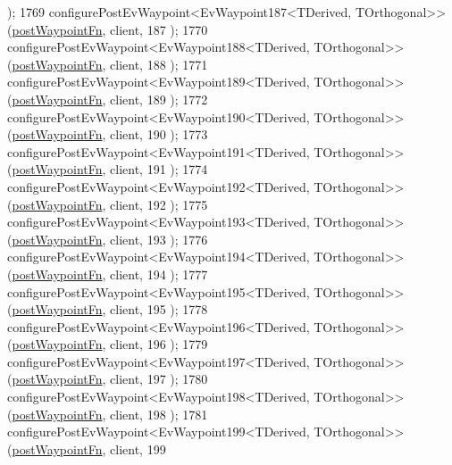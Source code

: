 \begin{DoxyCode}
      );
1769     configurePostEvWaypoint<EvWaypoint187<TDerived, TOrthogonal>>(\hyperlink{classcl__move__base__z_1_1WaypointEventDispatcher_a964a57fcce5d48ec60243230722d8dd7}{postWaypointFn}, client, 187
      );
1770     configurePostEvWaypoint<EvWaypoint188<TDerived, TOrthogonal>>(\hyperlink{classcl__move__base__z_1_1WaypointEventDispatcher_a964a57fcce5d48ec60243230722d8dd7}{postWaypointFn}, client, 188
      );
1771     configurePostEvWaypoint<EvWaypoint189<TDerived, TOrthogonal>>(\hyperlink{classcl__move__base__z_1_1WaypointEventDispatcher_a964a57fcce5d48ec60243230722d8dd7}{postWaypointFn}, client, 189
      );
1772     configurePostEvWaypoint<EvWaypoint190<TDerived, TOrthogonal>>(\hyperlink{classcl__move__base__z_1_1WaypointEventDispatcher_a964a57fcce5d48ec60243230722d8dd7}{postWaypointFn}, client, 190
      );
1773     configurePostEvWaypoint<EvWaypoint191<TDerived, TOrthogonal>>(\hyperlink{classcl__move__base__z_1_1WaypointEventDispatcher_a964a57fcce5d48ec60243230722d8dd7}{postWaypointFn}, client, 191
      );
1774     configurePostEvWaypoint<EvWaypoint192<TDerived, TOrthogonal>>(\hyperlink{classcl__move__base__z_1_1WaypointEventDispatcher_a964a57fcce5d48ec60243230722d8dd7}{postWaypointFn}, client, 192
      );
1775     configurePostEvWaypoint<EvWaypoint193<TDerived, TOrthogonal>>(\hyperlink{classcl__move__base__z_1_1WaypointEventDispatcher_a964a57fcce5d48ec60243230722d8dd7}{postWaypointFn}, client, 193
      );
1776     configurePostEvWaypoint<EvWaypoint194<TDerived, TOrthogonal>>(\hyperlink{classcl__move__base__z_1_1WaypointEventDispatcher_a964a57fcce5d48ec60243230722d8dd7}{postWaypointFn}, client, 194
      );
1777     configurePostEvWaypoint<EvWaypoint195<TDerived, TOrthogonal>>(\hyperlink{classcl__move__base__z_1_1WaypointEventDispatcher_a964a57fcce5d48ec60243230722d8dd7}{postWaypointFn}, client, 195
      );
1778     configurePostEvWaypoint<EvWaypoint196<TDerived, TOrthogonal>>(\hyperlink{classcl__move__base__z_1_1WaypointEventDispatcher_a964a57fcce5d48ec60243230722d8dd7}{postWaypointFn}, client, 196
      );
1779     configurePostEvWaypoint<EvWaypoint197<TDerived, TOrthogonal>>(\hyperlink{classcl__move__base__z_1_1WaypointEventDispatcher_a964a57fcce5d48ec60243230722d8dd7}{postWaypointFn}, client, 197
      );
1780     configurePostEvWaypoint<EvWaypoint198<TDerived, TOrthogonal>>(\hyperlink{classcl__move__base__z_1_1WaypointEventDispatcher_a964a57fcce5d48ec60243230722d8dd7}{postWaypointFn}, client, 198
      );
1781     configurePostEvWaypoint<EvWaypoint199<TDerived, TOrthogonal>>(\hyperlink{classcl__move__base__z_1_1WaypointEventDispatcher_a964a57fcce5d48ec60243230722d8dd7}{postWaypointFn}, client, 199

\end{DoxyCode}
